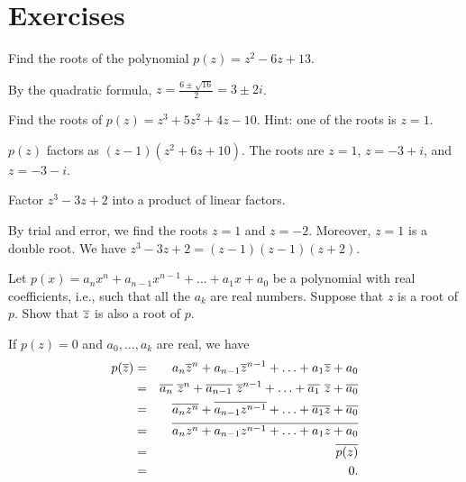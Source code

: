 \section*{Exercises}

\begin{ex}
  Find the roots of the polynomial $p(z) = z^2-6z+13$.
  \begin{sol}
    By the quadratic formula, $\displaystyle z=\frac{6\pm\sqrt{16}}{2}
      = 3\pm 2i$.
  \end{sol}
\end{ex}

\begin{ex}
  Find the roots of $p(z) = z^3 + 5z^2 + 4z - 10$. Hint: one of the
  roots is $z=1$.
  \begin{sol}
    $p(z)$ factors as $(z-1)(z^2+6z+10)$. The roots are $z=1$,
    $z=-3+i$, and $z=-3-i$.
  \end{sol}
\end{ex}

\begin{ex}
  Factor $z^3 - 3z + 2$ into a product of linear factors.
  \begin{sol}
    By trial and error, we find the roots $z=1$ and $z=-2$. Moreover,
    $z=1$ is a double root. We have $z^3 - 3z + 2 = (z-1)(z-1)(z+2)$.
  \end{sol}
\end{ex}

\begin{ex}
  Let $p(x) =a_{n}x^{n}+a_{n-1}x^{n-1}+\ldots+a_{1}x+a_{0}$ be a
  polynomial with real coefficients, i.e., such that all the $a_{k}$
  are real numbers. Suppose that $z$ is a root of $p$. Show that
  $\overline{z}$ is also a root of $p$.
  \begin{sol}
    If $p(z) =0$ and $a_0,\ldots,a_k$ are real, we have
    \begin{eqnarray*}
      p(\conjugate{z})
      &=& a_{n}\conjugate{z}^{n}+a_{n-1}\conjugate{z}^{n-1}+\ldots +a_{1}\conjugate{z}
          +a_{0} \\
      &=&\conjugate{a_{n}}\ \conjugate{z}^{n}+\conjugate{a_{n-1}}\ \conjugate{z}
      ^{n-1}+\ldots +\conjugate{a_{1}}\ \conjugate{z}+\conjugate{a_{0}}
      \\
      &=& \conjugate{a_{n}z^{n}}+\conjugate{a_{n-1}z^{n-1}}+\ldots +\conjugate{a_{1}z}+
          \conjugate{a_{0}} \\
      &=& \conjugate{a_{n}z^{n}+a_{n-1}z^{n-1}+\ldots+a_{1}z+a_{0}} \\
      &=& \conjugate{p(z) } \\
      &=& 0.
    \end{eqnarray*}
  \end{sol}
\end{ex}

